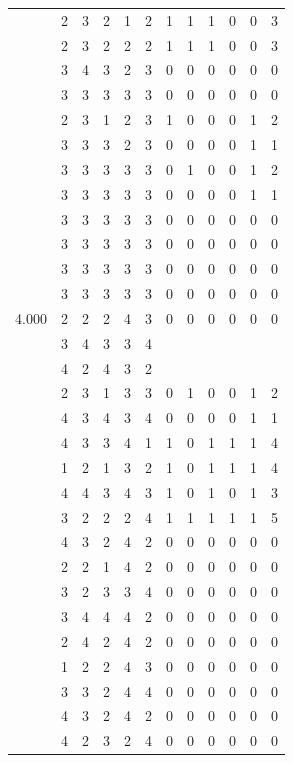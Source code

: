 \documentclass[]{book}
\theoremstyle{definition}
\theoremstyle{definition}
\theoremstyle{definition}
\theoremstyle{remark}
\begin{document}
\begin{table}
{\begin{tabular}[t]{rrrrrrrrrrrr}
 & 2 & 3 & 2 & 1 & 2 & 1 & 1 & 1 & 0 & 0 & 3\\
 & 2 & 3 & 2 & 2 & 2 & 1 & 1 & 1 & 0 & 0 & 3\\
 & 3 & 4 & 3 & 2 & 3 & 0 & 0 & 0 & 0 & 0 & 0\\
 & 3 & 3 & 3 & 3 & 3 & 0 & 0 & 0 & 0 & 0 & 0\\
 & 2 & 3 & 1 & 2 & 3 & 1 & 0 & 0 & 0 & 1 & 2\\
 & 3 & 3 & 3 & 2 & 3 & 0 & 0 & 0 & 0 & 1 & 1\\
 & 3 & 3 & 3 & 3 & 3 & 0 & 1 & 0 & 0 & 1 & 2\\
 & 3 & 3 & 3 & 3 & 3 & 0 & 0 & 0 & 0 & 1 & 1\\
 & 3 & 3 & 3 & 3 & 3 & 0 & 0 & 0 & 0 & 0 & 0\\
 & 3 & 3 & 3 & 3 & 3 & 0 & 0 & 0 & 0 & 0 & 0\\
 & 3 & 3 & 3 & 3 & 3 & 0 & 0 & 0 & 0 & 0 & 0\\
 & 3 & 3 & 3 & 3 & 3 & 0 & 0 & 0 & 0 & 0 & 0\\
4.000 & 2 & 2 & 2 & 4 & 3 & 0 & 0 & 0 & 0 & 0 & 0\\
 & 3 & 4 & 3 & 3 & 4 &  &  &  &  &  & \\
 & 4 & 2 & 4 & 3 & 2 &  &  &  &  &  & \\
 & 2 & 3 & 1 & 3 & 3 & 0 & 1 & 0 & 0 & 1 & 2\\
 & 4 & 3 & 4 & 3 & 4 & 0 & 0 & 0 & 0 & 1 & 1\\
 & 4 & 3 & 3 & 4 & 1 & 1 & 0 & 1 & 1 & 1 & 4\\
 & 1 & 2 & 1 & 3 & 2 & 1 & 0 & 1 & 1 & 1 & 4\\
 & 4 & 4 & 3 & 4 & 3 & 1 & 0 & 1 & 0 & 1 & 3\\
 & 3 & 2 & 2 & 2 & 4 & 1 & 1 & 1 & 1 & 1 & 5\\
 & 4 & 3 & 2 & 4 & 2 & 0 & 0 & 0 & 0 & 0 & 0\\
 & 2 & 2 & 1 & 4 & 2 & 0 & 0 & 0 & 0 & 0 & 0\\
 & 3 & 2 & 3 & 3 & 4 & 0 & 0 & 0 & 0 & 0 & 0\\
 & 3 & 4 & 4 & 4 & 2 & 0 & 0 & 0 & 0 & 0 & 0\\
 & 2 & 4 & 2 & 4 & 2 & 0 & 0 & 0 & 0 & 0 & 0\\
 & 1 & 2 & 2 & 4 & 3 & 0 & 0 & 0 & 0 & 0 & 0\\
 & 3 & 3 & 2 & 4 & 4 & 0 & 0 & 0 & 0 & 0 & 0\\
 & 4 & 3 & 2 & 4 & 2 & 0 & 0 & 0 & 0 & 0 & 0\\
 & 4 & 2 & 3 & 2 & 4 & 0 & 0 & 0 & 0 & 0 & 0\\

\end{tabular}}
\end{table}
\end{document}
